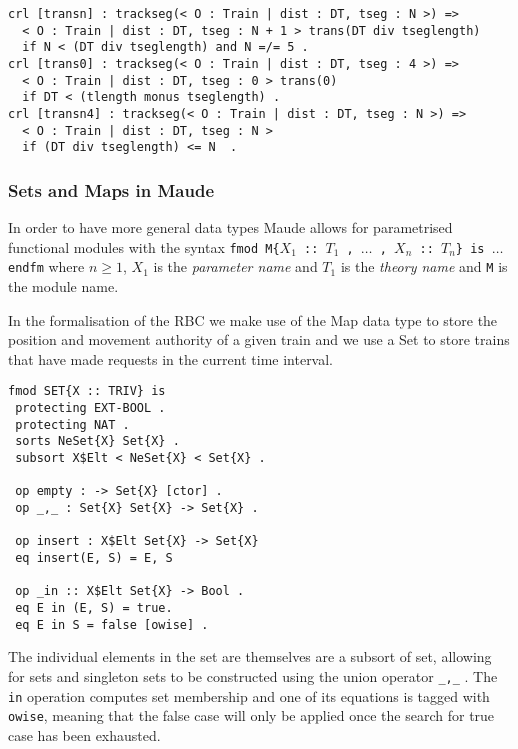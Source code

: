 \begin{lstlisting}[caption = "Rewriting rules for the trackseg operation"]
crl [transn] : trackseg(< O : Train | dist : DT, tseg : N >) => 
  < O : Train | dist : DT, tseg : N + 1 > trans(DT div tseglength) 
  if N < (DT div tseglength) and N =/= 5 .
crl [trans0] : trackseg(< O : Train | dist : DT, tseg : 4 >) => 
  < O : Train | dist : DT, tseg : 0 > trans(0) 
  if DT < (tlength monus tseglength) .
crl [transn4] : trackseg(< O : Train | dist : DT, tseg : N >) => 
  < O : Train | dist : DT, tseg : N >  
  if (DT div tseglength) <= N  .
\end{lstlisting}

\subsubsection*{Sets and Maps in Maude}
In order to have more general data types Maude allows for parametrised functional modules with the  syntax \texttt{fmod M\{$X_1$ :: $T_1$ , $\ldots$ , $X_n$ :: $T_n$\} is $\ldots$ endfm} where $n \geq 1$, $X_1$ is the \emph{parameter name} and $T_1$ is the \emph{theory name} and \texttt{M} is the module name.

In the formalisation of the RBC we make use of the Map data type to store the position and movement authority of a given train and we use a Set to store trains that have made requests in the current time interval. 

\begin{lstlisting}[caption = The specification of the Set data type in Maude]
fmod SET{X :: TRIV} is 
 protecting EXT-BOOL .
 protecting NAT .
 sorts NeSet{X} Set{X} .
 subsort X$Elt < NeSet{X} < Set{X} .

 op empty : -> Set{X} [ctor] .
 op _,_ : Set{X} Set{X} -> Set{X} .
 
 op insert : X$Elt Set{X} -> Set{X}
 eq insert(E, S) = E, S

 op _in :: X$Elt Set{X} -> Bool .
 eq E in (E, S) = true.
 eq E in S = false [owise] .

\end{lstlisting}

The individual elements in the set are themselves are a subsort of set, allowing for sets and singleton sets to be constructed using the union operator \texttt{\_,\_} . The \texttt{in} operation computes set membership and one of its equations is tagged with \texttt{owise}, meaning that the false case will only be applied once the search for true case has been exhausted.

